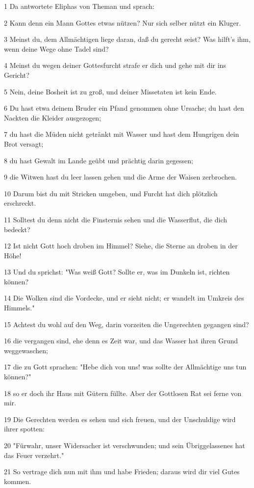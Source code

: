 \par 1 Da antwortete Eliphas von Theman und sprach:
\par 2 Kann denn ein Mann Gottes etwas nützen? Nur sich selber nützt ein Kluger.
\par 3 Meinst du, dem Allmächtigen liege daran, daß du gerecht seist? Was hilft's ihm, wenn deine Wege ohne Tadel sind?
\par 4 Meinst du wegen deiner Gottesfurcht strafe er dich und gehe mit dir ins Gericht?
\par 5 Nein, deine Bosheit ist zu groß, und deiner Missetaten ist kein Ende.
\par 6 Du hast etwa deinem Bruder ein Pfand genommen ohne Ursache; du hast den Nackten die Kleider ausgezogen;
\par 7 du hast die Müden nicht getränkt mit Wasser und hast dem Hungrigen dein Brot versagt;
\par 8 du hast Gewalt im Lande geübt und prächtig darin gegessen;
\par 9 die Witwen hast du leer lassen gehen und die Arme der Waisen zerbrochen.
\par 10 Darum bist du mit Stricken umgeben, und Furcht hat dich plötzlich erschreckt.
\par 11 Solltest du denn nicht die Finsternis sehen und die Wasserflut, die dich bedeckt?
\par 12 Ist nicht Gott hoch droben im Himmel? Siehe, die Sterne an droben in der Höhe!
\par 13 Und du sprichst: "Was weiß Gott? Sollte er, was im Dunkeln ist, richten können?
\par 14 Die Wolken sind die Vordecke, und er sieht nicht; er wandelt im Umkreis des Himmels."
\par 15 Achtest du wohl auf den Weg, darin vorzeiten die Ungerechten gegangen sind?
\par 16 die vergangen sind, ehe denn es Zeit war, und das Wasser hat ihren Grund weggewaschen;
\par 17 die zu Gott sprachen: "Hebe dich von uns! was sollte der Allmächtige uns tun können?"
\par 18 so er doch ihr Haus mit Gütern füllte. Aber der Gottlosen Rat sei ferne von mir.
\par 19 Die Gerechten werden es sehen und sich freuen, und der Unschuldige wird ihrer spotten:
\par 20 "Fürwahr, unser Widersacher ist verschwunden; und sein Übriggelassenes hat das Feuer verzehrt."
\par 21 So vertrage dich nun mit ihm und habe Frieden; daraus wird dir viel Gutes kommen.
